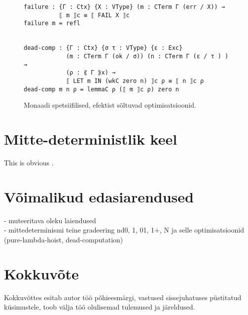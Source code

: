 \documentclass[a4paper,12pt]{article}
\begin{document}
\begin{figure}
  \begin{BVerbatim}
failure : {Γ : Ctx} {X : VType} (m : CTerm Γ (err / X)) →
          ⟦ m ⟧c ≡ ⟦ FAIL X ⟧c
failure m = refl


dead-comp : {Γ : Ctx} {σ τ : VType} {ε : Exc}
            (m : CTerm Γ (ok / σ)) (n : CTerm Γ (ε / τ ) ) →
            (ρ : ⟪ Γ ⟫x) → 
            ⟦ LET m IN (wkC zero n) ⟧c ρ ≡ ⟦ n ⟧c ρ
dead-comp m n ρ = lemmaC ρ (⟦ m ⟧c ρ) zero n
  \end{BVerbatim}
  \caption{Monaadi spetsiifilised, efektist sõltuvad optimisatsioonid.}
  \label{fig:exc.opt2}
\end{figure}
\clearpage

\section{Mitte-deterministlik keel}

This is obvious \cite{Benton2016}. \cite{Katsumata2014}

\clearpage

\section{Võimalikud edasiarendused}

- muteeritava oleku laiendused\\
- mittedeterminismi teine gradeering nd0, 1, 01, 1+, N ja selle optimisatsioonid (pure-lambda-hoist, dead-computation)

\clearpage

\section{Kokkuvõte}
Kokkuvõttes esitab autor töö põhieesmärgi, vastused sissejuhatuses püstitatud
küsimustele, toob välja töö olulisemad tulemused ja järeldused.

\clearpage

\renewcommand{\baselinestretch}{1.15}
\small



\end{document}
